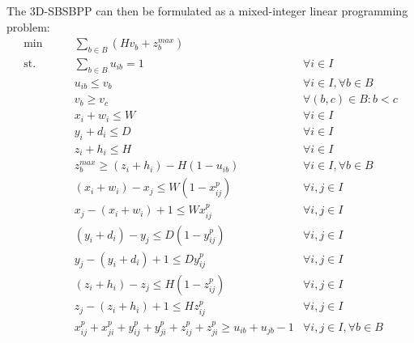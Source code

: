 The 3D-SBSBPP can then be formulated as a mixed-integer linear programming problem:
\label{par:standard_const}
\begin{align}
   \min       \qquad& \sum\limits_{b \in B} (H v_b + z^{max}_b) & \label{eq:objective} \\
   \text{st.} \qquad& \sum\limits_{b \in B}{u_{ib}} = 1 & \forall i \in I  \label{cons:all_items_in_bin} \\
                    & u_{ib} \le v_b & \forall i \in I, \forall b \in B \label{cons:items_in_used_bins} \\
                    & v_b \ge v_c & \forall (b,c) \in B : b < c  \label{cons:bin_breaking} \\
                    & x_i + w_i \le W & \forall i \in I \label{cons:inside_x} \\ 
                    & y_i + d_i \le D & \forall i \in I \label{cons:inside_y} \\ 
                    & z_i + h_i \le H & \forall i \in I \label{cons:inside_z} \\ 
                    & z^{max}_b \ge (z_i + h_i) - H(1-u_{ib}) & \forall i \in I, \forall b \in B \label{cons:maxz} \\
                    & (x_i + w_i) - x_j\le W(1 - x^p_{ij}) & \forall i,j \in I \label{cons:x_prec_1} \\
                    & x_j - (x_i + w_i) + 1 \le W x^p_{ij} & \forall i,j \in I \label{cons:x_prec_2} \\
                    & (y_i + d_i) - y_j \le D(1 - y^p_{ij}) & \forall i,j \in I \label{cons:y_prec_1} \\
                    & y_j - (y_i + d_i) + 1 \le D y^p_{ij} & \forall i,j \in I \label{cons:y_prec_2} \\
                    & (z_i + h_i) - z_j\le H(1 - z^p_{ij}) & \forall i,j \in I \label{cons:z_prec_1} \\
                    & z_j - (z_i + h_i) + 1 \le H z^p_{ij} & \forall i,j \in I \label{cons:z_prec_2} \\
                    & x^p_{ij} + x^p_{ji} + y^p_{ij} + y^p_{ji} + z^p_{ij} + z^p_{ji} \ge u_{ib} + u_{jb} - 1 & \forall i,j \in I, \forall b \in B \label{cons:no_overlap}
\end{align}

